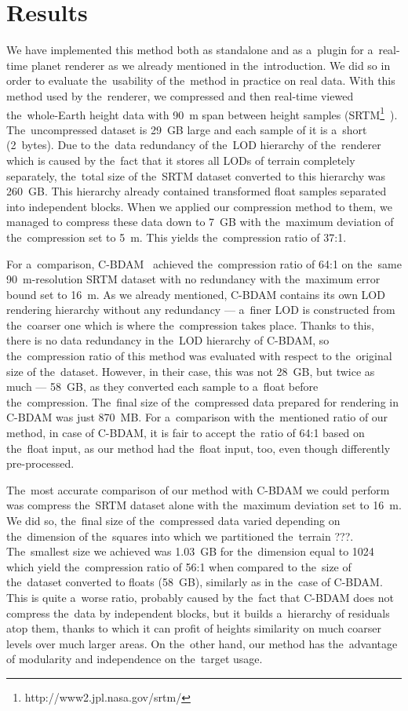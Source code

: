 \chapter{Results}\label{chap:results}

We have implemented this method both as standalone and as a~plugin for a~real-time planet renderer as we already mentioned in the~introduction. We did so in order to evaluate the~usability of the~method in practice on real data. With this method used by the~renderer, we compressed and then real-time viewed the~whole-Earth height data with 90~m span between height samples (SRTM\footnote{http://www2.jpl.nasa.gov/srtm/}~\cite{srtm}). The~uncompressed dataset is 29~GB large and each sample of it is a~short (2~bytes). Due to the~data redundancy of the~LOD hierarchy of the~renderer which is caused by the~fact that it stores all LODs of terrain completely separately, the~total size of the~SRTM dataset converted to this hierarchy was 260~GB. This hierarchy already contained transformed float samples separated into independent blocks. When we applied our compression method to them, we managed to compress these data down to 7~GB with the~maximum deviation of the~compression set to 5~m. This yields the~compression ratio of 37:1.

For a~comparison, C-BDAM~\cite{cbdam} achieved the~compression ratio of 64:1 on the~same 90~m-resolution SRTM dataset with no redundancy with the~maximum error bound set to 16~m. As we already mentioned, C-BDAM contains its own LOD rendering hierarchy without any redundancy --- a~finer LOD is constructed from the~coarser one which is where the~compression takes place. Thanks to this, there is no data redundancy in the~LOD hierarchy of C-BDAM, so the~compression ratio of this method was evaluated with respect to the~original size of the~dataset. However, in their case, this was not 28~GB, but twice as much --- 58~GB, as they converted each sample to a~float before the~compression. The~final size of the~compressed data prepared for rendering in C-BDAM was just 870~MB. For a~comparison with the~mentioned ratio of our method, in case of C-BDAM, it is fair to accept the~ratio of 64:1 based on the~float input, as our method had the~float input, too, even though differently pre-processed.

The~most accurate comparison of our method with C-BDAM we could perform was compress the~SRTM dataset alone with the~maximum deviation set to 16~m. We did so, the~final size of the~compressed data varied depending on the~dimension of the~squares into which we partitioned the~terrain ???. The~smallest size we achieved was 1.03~GB for the~dimension equal to 1024 which yield the~compression ratio of 56:1 when compared to the~size of the~dataset converted to floats (58~GB), similarly as in the~case of C-BDAM. This is quite a~worse ratio, probably caused by the~fact that C-BDAM does not compress the~data by independent blocks, but it builds a~hierarchy of residuals atop them, thanks to which it can profit of heights similarity on much coarser levels over much larger areas. On the~other hand, our method has the~advantage of modularity and independence on the~target usage.

